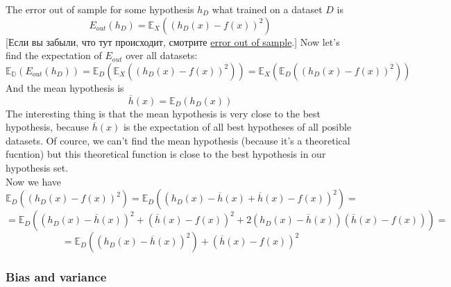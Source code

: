 The error out of sample for some hypothesis $h_D$ what trained on a dataset $D$ is
$$E_{out}(h_D)=\mathbb{E}_X\left(\left(h_D(x)-f(x)\right)^2\right)$$
[Если вы забыли, что тут происходит, смотрите \hyperlink{ein_and_eout}{error out of sample}.] Now let's find the expectation of $E_{out}$ over all datasets:
$$\mathbb{E_D}\left(E_{out}(h_D)\right)=\mathbb{E}_D\left(\mathbb{E}_X\left(\left(h_D(x)-f(x)\right)^2\right)\right)=\mathbb{E}_X\left(\mathbb{E}_D\left(\left(h_D(x)-f(x)\right)^2\right)\right)$$
And the mean hypothesis is
$$\overline{h}(x)=\mathbb{E}_D\left(h_D(x)\right)$$
The interesting thing is that the mean hypothesis is very close to the best hypothesis, because $\overline{h}(x)$ is the expectation of all best hypotheses of all posible datasets. Of cource, we can't find the mean hypothesis (because it's a theoretical fucntion) but this theoretical function is close to the best hypothesis in our hypothesis set.\\
Now we have
$$\mathbb{E}_D\left(\left(h_D(x)-f(x)\right)^2\right)=\mathbb{E}_D\left(\left(h_D(x)-\overline{h}(x)+\overline{h}(x)-f(x)\right)^2\right)=$$
$$=\mathbb{E}_D\left(\left(h_D(x)-\overline{h}(x)\right)^2+\left(\overline{h}(x)-f(x)\right)^2+2\left(h_D(x)-\overline{h}(x)\right)\left(\overline{h}(x)-f(x)\right)\right)=$$
$$=\mathbb{E}_D\left(\left(h_D(x)-\overline{h}(x)\right)^2\right)+\left(\overline{h}(x)-f(x)\right)^2$$

\subsubsection*{Bias and variance}

